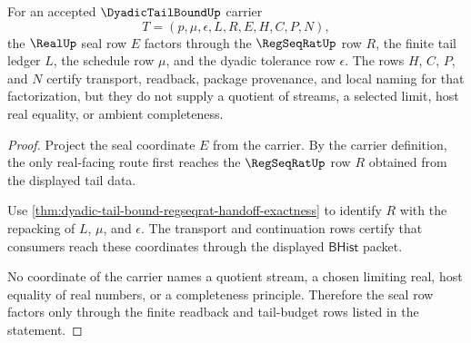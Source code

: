 \begin{theorem}
\label{thm:dyadic-tail-bound-real-seal-factorization}
For an accepted $\DyadicTailBoundUp$ carrier
$$
T=(p,\mu,\epsilon,L,R,E,H,C,P,N),
$$
the $\RealUp$ seal row $E$ factors through the $\RegSeqRatUp$ row $R$, the finite tail ledger $L$, the schedule row $\mu$, and the dyadic tolerance row $\epsilon$. The rows $H$, $C$, $P$, and $N$ certify transport, readback, package provenance, and local naming for that factorization, but they do not supply a quotient of streams, a selected limit, host real equality, or ambient completeness.
\end{theorem}
\begin{proof}
Project the seal coordinate $E$ from the carrier. By the carrier definition, the only real-facing route first reaches the $\RegSeqRatUp$ row $R$ obtained from the displayed tail data.

Use \autoref{thm:dyadic-tail-bound-regseqrat-handoff-exactness} to identify $R$ with the repacking of $L$, $\mu$, and $\epsilon$. The transport and continuation rows certify that consumers reach these coordinates through the displayed $\mathsf{BHist}$ packet.

No coordinate of the carrier names a quotient stream, a chosen limiting real, host equality of real numbers, or a completeness principle. Therefore the seal row factors only through the finite readback and tail-budget rows listed in the statement.
\end{proof}

